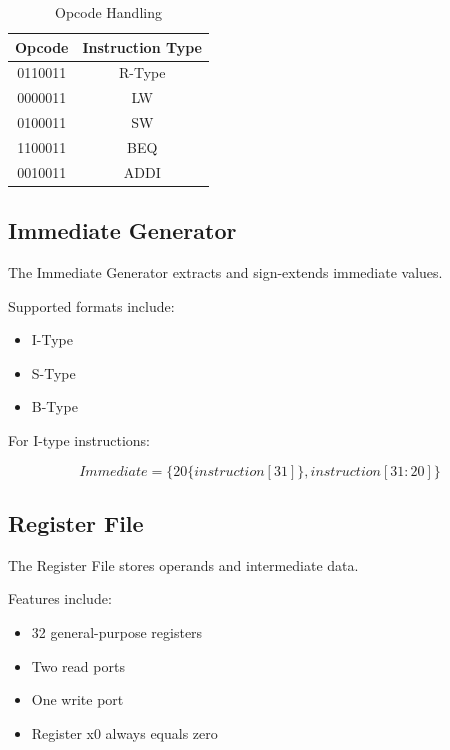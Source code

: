\documentclass[conference]{IEEEtran}
\begin{document}
\begin{table}[H]
\caption{Opcode Handling}
\centering
\begin{tabular}{|c|c|}
\hline
Opcode & Instruction Type \\
\hline
0110011 & R-Type \\
0000011 & LW \\
0100011 & SW \\
1100011 & BEQ \\
0010011 & ADDI \\
\hline
\end{tabular}
\end{table}


\subsection{Immediate Generator}

The Immediate Generator extracts and sign-extends immediate values.

Supported formats include:

\begin{itemize}
    \item I-Type
    \item S-Type
    \item B-Type
\end{itemize}

For I-type instructions:

\[
Immediate = \{20\{instruction[31]\}, instruction[31:20]\}
\]


\subsection{Register File}

The Register File stores operands and intermediate data.

Features include:

\begin{itemize}
    \item 32 general-purpose registers
    \item Two read ports
    \item One write port
    \item Register x0 always equals zero
\end{itemize}

\end{document}

